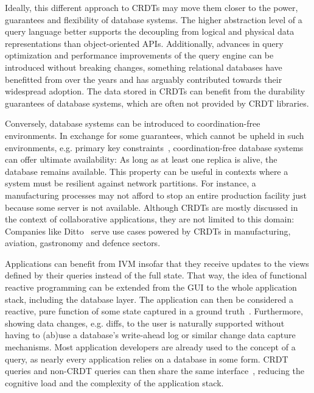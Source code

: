 Ideally, this different approach to \acp{CRDT} may move them closer to the power,
guarantees and flexibility of database systems.
The higher abstraction level of a query language better supports the decoupling
from logical and physical data representations than object-oriented APIs.
Additionally, advances in query optimization and performance improvements
of the query engine can be introduced without breaking changes,
something relational databases have benefitted from over the years and
has arguably contributed towards their widespread adoption.
The data stored in \acp{CRDT} can benefit from the durability guarantees of
database systems, which are often not provided by \ac{CRDT} libraries.


Conversely, database systems can be introduced to coordination-free environments.
In exchange for some guarantees, which cannot be upheld in such environments,
e.g. primary key constraints~\cite{bailis2014coordination},
coordination-free database systems can offer ultimate availability:
As long as at least one replica is alive, the database remains available.
This property can be useful in contexts where a system must be resilient
against network partitions.
For instance, a manufacturing processes may not afford to stop an entire
production facility just because some server is not available.
Although \acp{CRDT} are mostly discussed in the context of collaborative
applications, they are not limited to this domain:
Companies like Ditto~\cite{ditto} serve use cases powered by \acp{CRDT}
in manufacturing, aviation, gastronomy and defence sectors.

Applications can benefit from \ac{IVM} insofar that they receive updates
to the views defined by their queries instead of the full state.
That way, the idea of functional reactive programming can be extended from
the \ac{GUI} to the whole application stack, including the database layer.
The application can then be considered a reactive, pure function
of some state captured in a ground truth~\cite{litt2023riffle}.
Furthermore, showing data changes, e.g. diffs, to the user is naturally supported
without having to (ab)use a database's write-ahead log or similar change
data capture mechanisms.
Most application developers are already used to the concept of a query,
as nearly every application relies on a database in some form.
\ac{CRDT} queries and non-\ac{CRDT} queries can then share the
same interface~\cite{litt2023riffle},
reducing the cognitive load and the complexity of the application stack.

